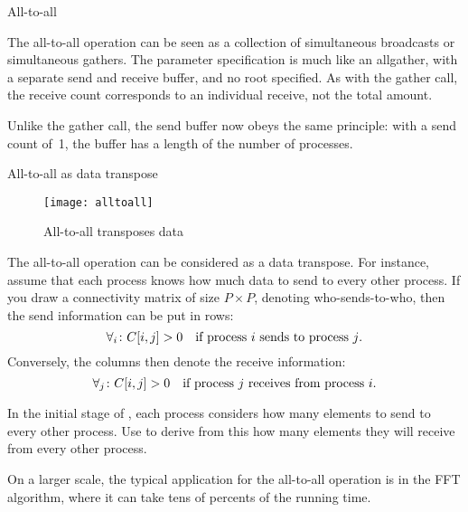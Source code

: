 
 {All-to-all}
\label{sec:alltoall}

The all-to-all operation can be seen as a collection of simultaneous
broadcasts or simultaneous gathers. The parameter specification is much
like an allgather, with a separate send and receive buffer, and no
root specified. As with the gather call, the receive count corresponds
to an individual receive, not the total amount.

Unlike the gather call, the send buffer now obeys the same principle:
with a send count of~1, the buffer has a length of the number of
processes.


 {All-to-all as data transpose}
\label{sec:alltoall-transpose}

\begin{figure}[ht]
  \texttt{[image: alltoall]}
  \caption{All-to-all transposes data}
  \label{fig:alltoall}
\end{figure}

The all-to-all operation can be considered as a data transpose. For
instance, assume that each process knows how much data to send to
every other process. If you draw a connectivity matrix of size $P\times P$,
denoting who-sends-to-who, then the send information can be put in
rows:
\[ \forall_i\colon C[i,j]>0\quad\hbox{if process $i$ sends to process $j$}. \]
Conversely, the columns then denote the receive information:
\[ \forall_j\colon C[i,j]>0\quad\hbox{if process $j$ receives from process $i$}. \]

\begin{exercise}
  \label{ex:radixsort1}
  In the initial stage of , each process
  considers how many elements to send to every other process.
  Use  to derive from this how many
  elements they will receive from every other process.
\end{exercise}

On a larger scale, the typical application for the all-to-all
operation is in the \ac{FFT} algorithm, where it can take tens of
percents of the running time.

